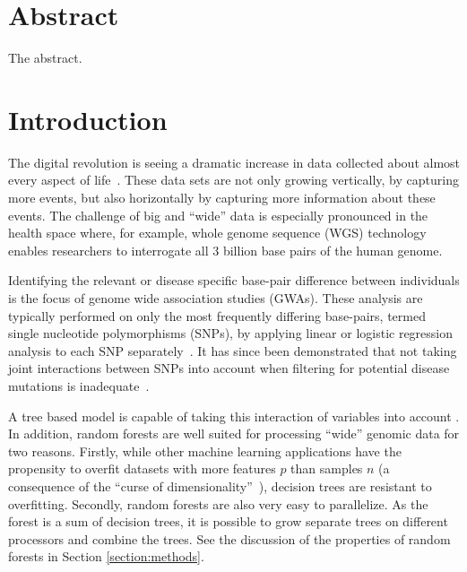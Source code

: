 \documentclass[10pt,letterpaper]{article}
\begin{document}
\clearpage

\section{Abstract}
The abstract.

\linenumbers

\section{Introduction}
The digital revolution is seeing a dramatic increase in data collected about almost every aspect of
life~\cite{Loebbecke2015}.  These data sets are not only growing vertically, by capturing more events, but also
horizontally by capturing more information about these events.  The challenge of big and ``wide'' data is especially
pronounced in the health space where, for example, whole genome sequence (WGS) technology enables researchers to
interrogate all 3 billion base pairs of the human genome.

Identifying the relevant or disease specific base-pair difference between individuals is the focus of genome wide
association studies (GWAs).  These analysis are typically performed on only the most frequently differing base-pairs,
termed single nucleotide polymorphisms (SNPs), by applying linear or logistic regression analysis to each SNP
separately~\cite{CCC2007}.  It has since been demonstrated that not taking joint interactions between SNPs into account
when filtering for potential disease mutations is inadequate~\cite{Manolio2009,Yang2011}.

A tree based model is capable of taking this interaction of variables into account \cite{Wright.et.al.2016}. In addition, random forests are well
suited for processing ``wide'' genomic data for two reasons.  Firstly, while other machine learning applications have
the propensity to overfit datasets with more features $p$ than samples $n$ (a consequence of the ``curse of
dimensionality''~\cite{Bauer2014, bellman1961adaptive}), decision trees are resistant to overfitting.  Secondly, random
forests are also very easy to parallelize. As the forest is a sum of decision trees, it is possible to grow separate
trees on different processors and combine the trees. See the discussion of the properties of random forests in Section
\ref{section:methods}.
\end{document}
